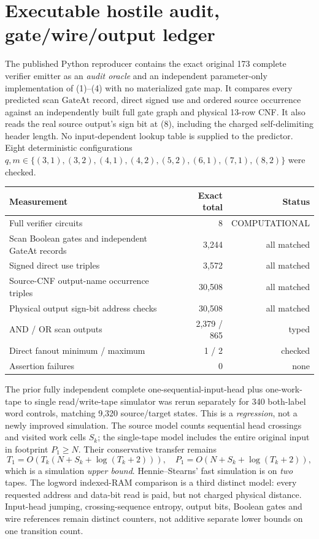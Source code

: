 \documentclass[11pt]{article}
\begin{document}
\section{Executable hostile audit, gate/wire/output ledger}
The published Python reproducer contains the exact original 173 complete verifier emitter as an \emph{audit oracle} and an independent parameter-only implementation of (1)--(4) with no materialized gate map. It compares every predicted scan \(\mathrm{GateAt}\) record, direct signed use and ordered source occurrence against an independently built full gate graph and physical 13-row CNF. It also reads the real source output's sign bit at (8), including the charged self-delimiting header length. No input-dependent lookup table is supplied to the predictor. Eight deterministic configurations $q,m\in\{(3,1),(3,2),(4,1),(4,2),(5,2),(6,1),(7,1),(8,2)\}$ were checked.
\begin{center}\small\begin{tabular}{lrr}\toprule
Measurement & Exact total & Status\\\midrule
Full verifier circuits & 8 & COMPUTATIONAL\\
Scan Boolean gates and independent GateAt records & 3,244 & all matched\\
Signed direct use triples & 3,572 & all matched\\
Source-CNF output-name occurrence triples & 30,508 & all matched\\
Physical output sign-bit address checks & 30,508 & all matched\\
AND / OR scan outputs & 2,379 / 865 & typed\\
Direct fanout minimum / maximum & 1 / 2 & checked\\
Assertion failures & 0 & none\\\bottomrule\end{tabular}\end{center}
The prior fully independent complete one-sequential-input-head plus one-work-tape to single read/write-tape simulator was rerun separately for 340 both-label word controls, matching 9,320 source/target states. This is a \emph{regression}, not a newly improved simulation. The source model counts sequential head crossings and visited work cells $S_k$; the single-tape model includes the entire original input in footprint $P_1\ge N$. Their conservative transfer remains
\[
T_1=O(T_k(N+S_k+\log(T_k+2))),\quad P_1=O(N+S_k+\log(T_k+2)),\tag{10}
\]
which is a simulation \emph{upper bound}. Hennie--Stearns' fast simulation is on \emph{two} tapes. The logword indexed-RAM comparison is a third distinct model: every requested address and data-bit read is paid, but not charged physical distance. Input-head jumping, crossing-sequence entropy, output bits, Boolean gates and wire references remain distinct counters, not additive separate lower bounds on one transition count.
\end{document}
